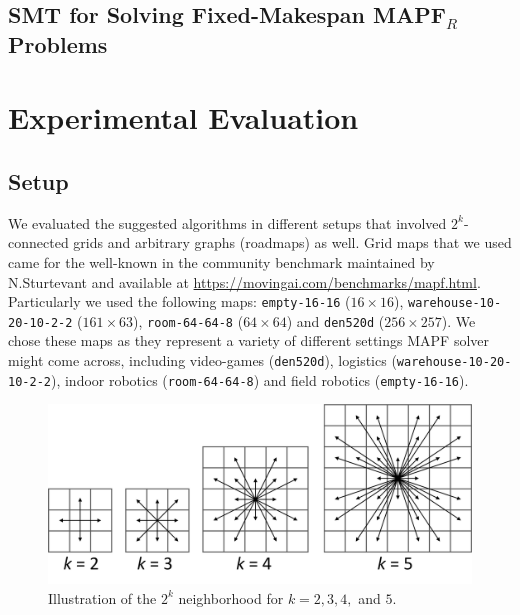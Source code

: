 \documentclass[review]{elsarticle}
\newtheorem{definition}{Definition}
\newcommand{\tuple}[1]{\ensuremath{\left \langle #1 \right \rangle }}
\newcommand\konstantin[1]{\nb{\textbf{Konstantin:}}{red}{#1}}
\newcommand\roni[1]{\nb{\textbf{Roni:}}{green}{#1}}
\newcommand{\mapfr}{\ac{MAPF}$_R$\xspace}
\newcommand{\mapf}{\ac{MAPF}\xspace}
\newcommand{\true}{\textit{true}\xspace}
\begin{document}
\subsection{SMT for Solving Fixed-Makespan \mapfr Problems}



\section{Experimental Evaluation}
\subsection{Setup}
We evaluated the suggested algorithms in different setups that involved $2^k$-connected grids \cite{rivera2017grid} and arbitrary graphs (roadmaps) as well. Grid maps that we used came for the well-known in the community benchmark maintained by N.Sturtevant \cite{stern2019mapf} and available at \url{https://movingai.com/benchmarks/mapf.html}. Particularly we used the following maps: \texttt{empty-16-16} ($16 \times 16$), \texttt{warehouse-10-20-10-2-2} ($161 \times 63$), \texttt{room-64-64-8} ($64 \times 64$) and \texttt{den520d} ($256 \times 257$). We chose these maps as they represent a variety of different settings \mapf solver might come across, including video-games (\texttt{den520d}), logistics (\texttt{warehouse-10-20-10-2-2}), indoor robotics (\texttt{room-64-64-8}) and field robotics (\texttt{empty-16-16}).

\begin{figure}
\centering
    \centering
    \includegraphics[width=0.75\columnwidth]{2k-neighborhood.png}
    \caption{Illustration of the $2^k$ neighborhood for $k=2,3,4,$ and $5$.}
    \label{fig:2k-grids}
\end{figure}
\end{document}
